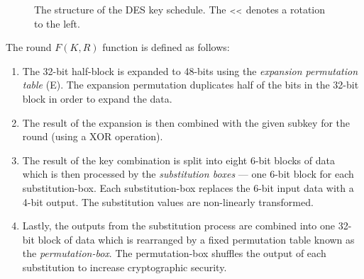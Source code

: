 \begin{figure}[H]
    \caption{The structure of the DES key schedule. The $\mathsmaller{<<}$ denotes a rotation to the left.}
\end{figure}

The round $F(K, R)$ function is defined as follows:

\begin{enumerate}
    \item The 32-bit half-block is expanded to 48-bits using the \textit{expansion permutation table} (E). The expansion permutation duplicates half of the bits in the 
          32-bit block in order to expand the data. 
    \item The result of the expansion is then combined with the given subkey for the round (using a XOR operation).
    \item The result of the key combination is split into eight 6-bit blocks of data which is then processed by the \textit{substitution boxes} --- one 6-bit block for 
    each substitution-box. Each substitution-box replaces the 6-bit input data with a 4-bit output. The substitution values are non-linearly transformed.
    \item Lastly, the outputs from the substitution process are combined into one 32-bit block of data which is rearranged by a fixed permutation table known as the
        \textit{permutation-box}. The permutation-box shuffles the output of each substitution to increase cryptographic security.
\end{enumerate}

